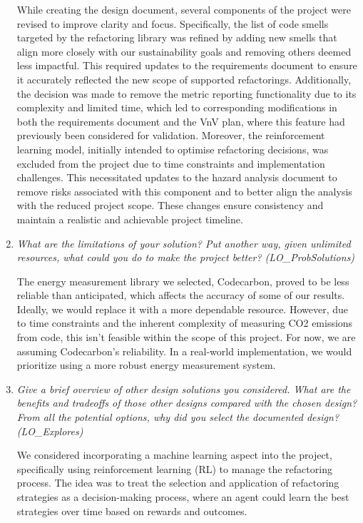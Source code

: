 \documentclass[12pt, titlepage]{article}
\begin{document}
\begin{enumerate}
  While creating the design document, several components of the project were revised to improve clarity and focus. Specifically, the list of code smells targeted by the refactoring library was refined by adding new smells that align more closely with our sustainability goals and removing others deemed less impactful. This required updates to the requirements document to ensure it accurately reflected the new scope of supported refactorings. Additionally, the decision was made to remove the metric reporting functionality due to its complexity and limited time, which led to corresponding modifications in both the requirements document and the VnV plan, where this feature had previously been considered for validation. Moreover, the reinforcement learning model, initially intended to optimise refactoring decisions, was excluded from the project due to time constraints and implementation challenges. This necessitated updates to the hazard analysis document to remove risks associated with this component and to better align the analysis with the reduced project scope. These changes ensure consistency and maintain a realistic and achievable project timeline. 

  \item \textit {What are the limitations of your solution?  Put another way, given unlimited resources, what could you do to make the project better? (LO\_ProbSolutions)}

  The energy measurement library we selected, Codecarbon, proved to be less reliable 
  than anticipated, which affects the accuracy of some of our results. Ideally, 
  we would replace it with a more dependable resource. However, due to time 
  constraints and the inherent complexity of measuring CO2 emissions from code, 
  this isn't feasible within the scope of this project. For now, we are assuming 
  Codecarbon's reliability. In a real-world implementation, we would prioritize 
  using a more robust energy measurement system.

  \item \textit {Give a brief overview of other design solutions you considered.  What
  are the benefits and tradeoffs of those other designs compared with the chosen
  design?  From all the potential options, why did you select the documented design?
  (LO\_Explores)}

  We considered incorporating a machine learning aspect into the project, 
  specifically using reinforcement learning (RL) to manage the refactoring 
  process. The idea was to treat the selection and application of 
  refactoring strategies as a decision-making process, where an agent 
  could learn the best strategies over time based on rewards and outcomes.


\end{enumerate}
\end{document}
